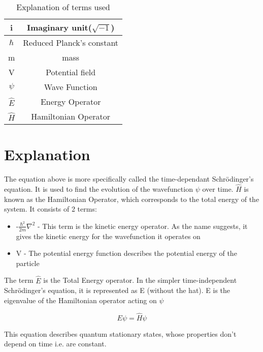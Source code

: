 \begin{table}
    \begin{center}
    \begin{tabular}{|c|c|}
    \hline
        i & Imaginary unit($\sqrt{-1}$) \\
    \hline
        $\hbar$ & Reduced Planck's constant \\
    \hline    
        m & mass \\
    \hline    
        V & Potential field \\
    \hline    
        $\psi$ & Wave Function \\
    \hline    
        $\hat{E}$ & Energy Operator \\
    \hline    
        $\hat{H}$ & Hamiltonian Operator \\
    \hline
    \end{tabular}
\end{center}
    \caption{Explanation of terms used}
\end{table}


\section{Explanation}

The equation above is more specifically called the time-dependant Schrödinger's equation. It is used to find the evolution of the wavefunction $\psi$ over time. $\hat{H}$ is known as the Hamiltonian Operator, which corresponds to the total energy of the system. It consists of 2 terms:

\begin{itemize}
    \item -$ \frac{\hbar^2}{2m}\nabla^2 $ - This term is the kinetic energy operator. As the name suggests, it gives the kinetic energy for the wavefunction it operates on
    \item V - The potential energy function describes the potential energy of the particle
\end{itemize}

The term $\hat{E}$ is the Total Energy operator. In the simpler time-independent Schrödinger's
 equation, it is represented as E (without the hat). E is the eigenvalue of the Hamiltonian operator acting on $\psi$

\begin{equation}
    E\psi=\hat{H}\psi
\end{equation}

This equation describes quantum stationary states, whose properties don't depend on time i.e. are constant.


